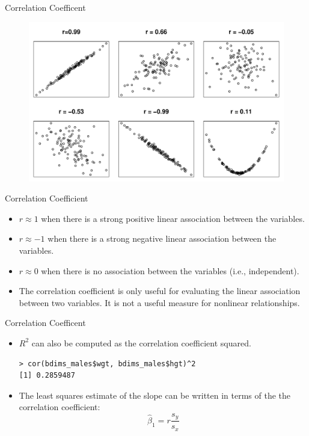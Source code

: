 \documentclass[10pt]{beamer}
\begin{document}
\begin{frame}{Correlation Coefficent}
\begin{figure}
\includegraphics[scale=0.5]{figure/correlations.pdf}
\end{figure}
\end{frame}

\begin{frame}{Correlation Coefficient}
\begin{itemize}
\item $r \approx 1$ when there is a strong positive linear association between the variables.
\vspace{5pt}
\item $r \approx -1$ when there is a strong negative linear association between the variables.
\vspace{5pt}
\item $r \approx 0$ when there is no association between the variables (i.e., independent).
\vspace{5pt}
\item The correlation coefficient is only useful for evaluating the linear association between two variables.  It is not a useful measure for nonlinear relationships.
\end{itemize}
\end{frame}

\begin{frame}[fragile]{Correlation Coefficent}
\begin{itemize}
\item $R^2$ can also be computed as the correlation coefficient squared.
\begin{verbatim}
> cor(bdims_males$wgt, bdims_males$hgt)^2
[1] 0.2859487
\end{verbatim}
\vspace{10pt}
\item The least squares estimate of the slope can be written in terms of the the correlation coefficient:
$$\hat{\beta}_1 = r \frac{s_y}{s_x}$$
\end{itemize}
\end{frame}
\end{document}
